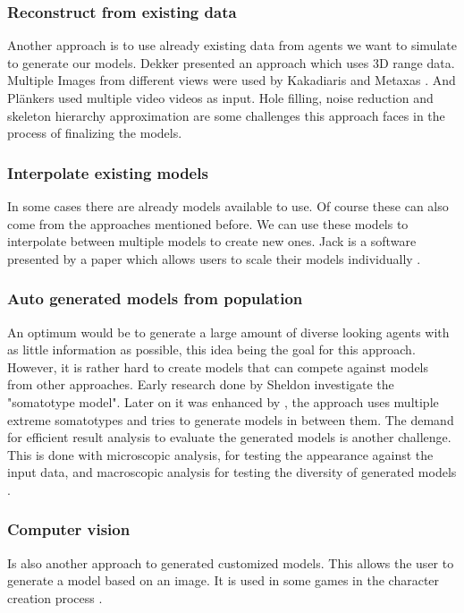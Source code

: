 \documentclass{acmsiggraph}               %
\begin{document}
\subsubsection{Reconstruct from existing data}
Another approach is to use already existing data  from agents we want to simulate to generate our models. Dekker  presented an approach which uses 3D range data. Multiple Images from different views were used by Kakadiaris and Metaxas . And Plänkers  used multiple video videos as input.
Hole filling, noise reduction and skeleton hierarchy approximation are some challenges this approach faces in the process of finalizing the models. 

\subsubsection{Interpolate existing models}
In some cases there are already models available to use. Of course these can also come from the approaches mentioned before. We can use these models to interpolate between multiple models to create new ones. Jack is a software presented by a paper which allows users to scale their models individually \cite{azuola_building_1994}.

\subsubsection{Auto generated models from population}
An optimum would be to generate a large amount of diverse looking agents with as little information as possible, this idea being the goal for this approach. However, it is rather hard to create models that can compete against models from other approaches. Early research done by Sheldon  investigate the "somatotype model". Later on it was enhanced by \cite{carter_somatotyping_1990}, the approach uses multiple extreme somatotypes and tries to generate models in between them. The demand for efficient result analysis to evaluate the generated models is another challenge. This is done with microscopic analysis, for testing the appearance against the input data, and macroscopic analysis for testing the diversity of generated models \cite{thalmann_crowd_2013}. 

\subsubsection{Computer vision}
Is also another approach to generated customized models. This allows the user to generate a model based on an image. It is used in some games in the character creation process \cite{thalmann_crowd_2013}. 
\end{document}
